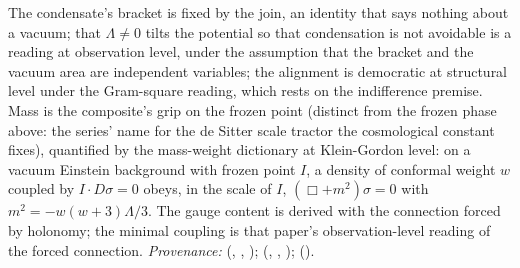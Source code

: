 The condensate's bracket is fixed by the join, an identity that says nothing about a vacuum; that $\Lambda \neq 0$ tilts the potential so that condensation is not avoidable is a reading at observation level, under the assumption that the bracket and the vacuum area are independent variables; the alignment is democratic at structural level under the Gram-square reading, which rests on the indifference premise. Mass is the composite's grip on the frozen point (distinct from the frozen phase above: the series' name for the de Sitter scale tractor the cosmological constant fixes), quantified by the mass-weight dictionary at Klein-Gordon level: on a vacuum Einstein background with frozen point $I$, a density of conformal weight $w$ coupled by $I \cdot D\sigma = 0$ obeys, in the scale of $I$, $(\Box + m^{2})\sigma = 0$ with $m^{2} = -w(w+3)\Lambda/3$. The gauge content is derived with the connection forced by holonomy; the minimal coupling is that paper's observation-level reading of the forced connection. \emph{Provenance:} \cite[Prop.~4.1, Prop.~4.2(2), Prop.~4.3(3)]{ButlerT13} (, , ); \cite[Thm.~3.1, Lem.~5.1, Def.~5.4, Thm.~5.6]{ButlerT11} (, , ); \cite[Prop.~5.7 and the paragraph following it]{ButlerT12} ().
